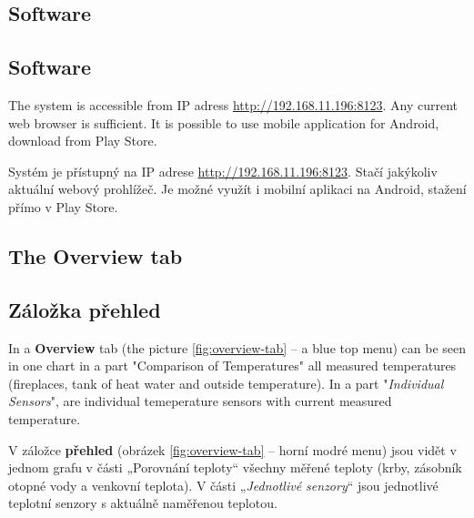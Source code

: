 \begin{English}
\section{Software}
\end{English}

\begin{Czech}
\section{Software}
\end{Czech}


\begin{English}
The system is accessible from IP adress \url{http://192.168.11.196:8123}.  Any current web browser is sufficient. It is possible to use mobile application for Android, download from Play Store.
\end{English}

\begin{Czech}
Systém je přístupný na IP adrese \url{http://192.168.11.196:8123}. Stačí jakýkoliv aktuální webový prohlížeč. Je možné využít i mobilní aplikaci na Android, stažení přímo v Play Store.
\end{Czech}


\begin{English}
\subsection{The Overview tab}
\end{English}

\begin{Czech}
\subsection{Záložka přehled}
\end{Czech}


\begin{English}
In a \textbf{Overview} tab (the picture \ref{fig:overview-tab} – a blue top menu) can be seen in one chart in a part "Comparison of Temperatures" all measured temperatures (fireplaces, tank of heat water and outside temperature). In a part "\textit{Individual Sensors}", are individual temeperature sensors with current measured temperature.
\end{English}

\begin{Czech}
V záložce \textbf{přehled} (obrázek \ref{fig:overview-tab} – horní modré menu) jsou vidět v jednom grafu v části „Porovnání teploty“ všechny měřené teploty (krby, zásobník otopné vody a venkovní teplota). V části „\textit{Jednotlivé senzory}“ jsou jednotlivé teplotní senzory s aktuálně naměřenou teplotou. 
\end{Czech}


